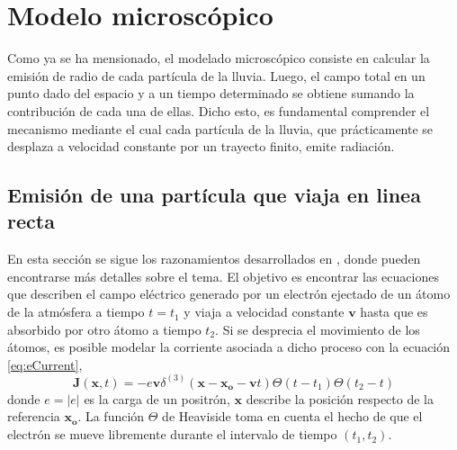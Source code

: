 \section{Modelo microsc\'opico}

Como ya se ha mensionado, el modelado microsc\'opico consiste en calcular la emisi\'on de radio de cada part\'icula de la lluvia.
Luego, el campo total en un punto dado del espacio y a un tiempo determinado se obtiene sumando la contribuci\'on de cada una de ellas.
Dicho esto, es fundamental comprender el mecanismo mediante el cual cada part\'icula de la lluvia, que pr\'acticamente se desplaza a velocidad constante por un trayecto finito, emite radiaci\'on.

\subsection{Emisi\'on de una part\'icula que viaja en linea recta}

En esta secci\'on se sigue los razonamientos desarrollados en \cite{alvarez:2013}, donde pueden encontrarse m\'as detalles sobre el tema.
El objetivo es encontrar las ecuaciones que describen el campo el\'ectrico generado por un electr\'on ejectado de un \'atomo de la atm\'osfera a tiempo $t=t_1$ y viaja a velocidad constante $\mathbf{v}$ hasta que es absorbido por otro \'atomo a tiempo $t_2$.
Si se desprecia el movimiento de los \'atomos, es posible modelar la corriente asociada a dicho proceso con la ecuaci\'on \ref{eq:eCurrent},
%
\begin{equation}
\mathbf{J}(\mathbf{x},t)=-e\mathbf{v}\delta^{(3)}(\mathbf{x}-\mathbf{x_o}-\mathbf{v}t)
\Theta(t-t_1)\Theta(t_2-t)
\label{eq:eCurrent}
\end{equation}
%
donde $e=|e|$ es la carga de un positr\'on, $\mathbf{x}$ describe la posici\'on respecto de la referencia $\mathbf{x_o}$.
La funci\'on $\Theta$ de Heaviside toma en cuenta el hecho de que el electr\'on se mueve libremente durante el intervalo de tiempo $(t_1,t_2)$.

